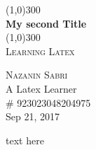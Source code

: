 \documentclass{article}
\begin{document}
\begin{titlepage}
	\begin{center}

	\line(1,0){300}\\
	[0.25in]
	\huge{\bfseries My second Title}\\
	[2mm]
	\line(1,0){300}\\
	[0.75cm]
	\textsc{\large Learning Latex}\\
	[10cm]
	\end{center}

	\begin{flushright}
	\textsc{\large Nazanin Sabri\\}
	A Latex Learner\\
	\# 923023048204975\\
	Sep 21, 2017
	\end{flushright}

\end{titlepage}

text here
\end{document}
